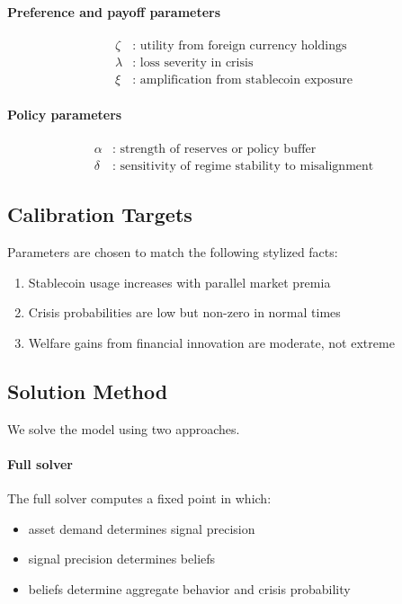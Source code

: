 \paragraph{Preference and payoff parameters}
\begin{align}
\zeta &\text{: utility from foreign currency holdings} \\
\lambda &\text{: loss severity in crisis} \\
\xi &\text{: amplification from stablecoin exposure}
\end{align}

\paragraph{Policy parameters}
\begin{align}
\alpha &\text{: strength of reserves or policy buffer} \\
\delta &\text{: sensitivity of regime stability to misalignment}
\end{align}

\subsection{Calibration Targets}

Parameters are chosen to match the following stylized facts:

\begin{enumerate}
\item Stablecoin usage increases with parallel market premia
\item Crisis probabilities are low but non-zero in normal times
\item Welfare gains from financial innovation are moderate, not extreme
\end{enumerate}

\subsection{Solution Method}

We solve the model using two approaches.

\paragraph{Full solver}

The full solver computes a fixed point in which:
\begin{itemize}
\item asset demand determines signal precision
\item signal precision determines beliefs
\item beliefs determine aggregate behavior and crisis probability
\end{itemize}

